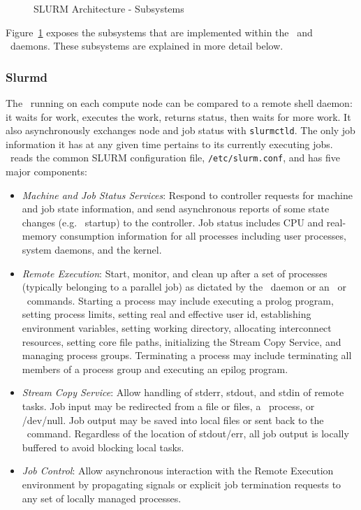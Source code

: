 \begin{figure}[tb]
\centerline{}
\caption{SLURM Architecture - Subsystems}
\label{archdetail}
\end{figure}

Figure~\ref{archdetail} exposes the subsystems that are implemented
within the \slurmd\ and \slurmctld\ daemons.  These subsystems
are explained in more detail below.

\subsubsection{Slurmd}

The \slurmd\ running on each compute node can be compared to a remote
shell daemon:  it waits for work, executes the work, returns status,
then waits for more work.  It also asynchronously exchanges node and job
status with {\tt slurmctld}.  The only job information it has at any given time
pertains to its currently executing jobs.
\slurmd\ reads the common SLURM configuration file, {\tt /etc/slurm.conf},
and has five major components:

\begin{itemize}
\item {\em Machine and Job Status Services}:  Respond to controller 
requests for machine and job state information, and send asynchronous 
reports of some state changes (e.g. \slurmd\ startup) to the controller.
Job status includes CPU and real-memory consumption information for all 
processes including user processes, system daemons, and the kernel. 

\item {\em Remote Execution}: Start, monitor, and clean up after a set
of processes (typically belonging to a parallel job) as dictated by the
\slurmctld\ daemon or an \srun\ or \scancel\ commands. Starting a process may
include executing a prolog program, setting process limits, setting real
and effective user id, establishing environment variables, setting working
directory, allocating interconnect resources, setting core file paths,
initializing the Stream Copy Service, and managing
process groups. Terminating a process may include terminating all members
of a process group and executing an epilog program.

\item {\em Stream Copy Service}: Allow handling of stderr, stdout, and
stdin of remote tasks. Job input may be redirected from a file or files, a
\srun\ process, or /dev/null.  Job output may be saved into local files or
sent back to the \srun\ command. Regardless of the location of stdout/err,
all job output is locally buffered to avoid blocking local tasks.

\item {\em Job Control}: Allow asynchronous interaction with the
Remote Execution environment by propagating signals or explicit job
termination requests to any set of locally managed processes.

\end{itemize}

